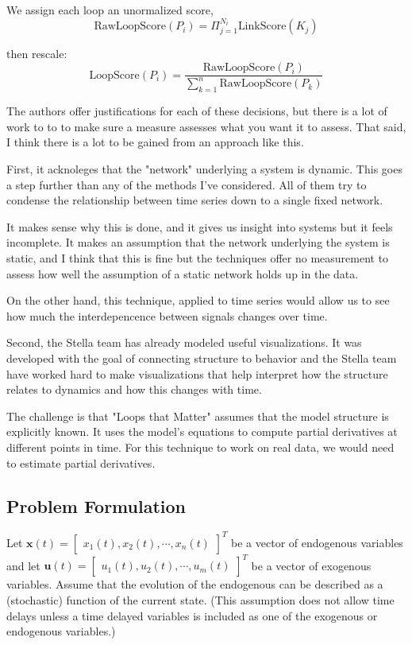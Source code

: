 \documentclass{article}
\begin{document}
        We assign each loop an unormalized score,
        \[
            \text{RawLoopScore}(P_i) = \Pi_{j=1}^{N_i} \text{LinkScore}(K_j)
        \]

        then rescale:
        \[
            \text{LoopScore}(P_i) = \frac{\text{RawLoopScore}(P_i)}{\sum_{k=1}^n \text{RawLoopScore}(P_k)}
        \]


        The authors offer justifications for each of these decisions, but there
        is a lot of work to to to make sure a measure assesses what you
        want it to assess. That said, I think there is a lot to be gained
        from an approach like this.

        First, it acknoleges that the "network" underlying a system
        is dynamic. This goes a step further than any of the methods I've
        considered. All of them try to condense the relationship between
        time series down to a single fixed network.

        It makes sense why this is done, and it gives us insight
        into systems but it feels incomplete. It makes an assumption that
        the network underlying the system is static, and I think that
        this is fine but the techniques
        offer no measurement to assess how well the assumption of a
        static network holds up in the data.

        On the other hand, this technique, applied to time series would allow
        us to see how much the interdepencence between signals changes over time.

        Second, the Stella team has already modeled useful visualizations.
        It was developed with the goal of connecting structure to behavior
        and the Stella team have worked hard to make visualizations
        that help interpret how the structure relates to dynamics
        and how this changes with time.

        The challenge is that "Loops that Matter" assumes that the model structure
        is explicitly known. It uses the model's equations to compute partial 
        derivatives at different points in time. For this technique to work on
        real data, we would need to estimate partial derivatives.

        \subsection{Problem Formulation}

        Let $\bm{x}(t) = \begin{bmatrix}
            x_1(t), x_2(t), \cdots, x_n(t)
        \end{bmatrix}^T$ be a vector of endogenous variables and let 
        $\bm{u}(t) = \begin{bmatrix}
            u_1(t), u_2(t), \cdots, u_m(t)
        \end{bmatrix}^T$ be a vector of exogenous variables. Assume that the
        evolution of the endogenous can be described as a (stochastic) function
        of the current state. (This assumption does not allow time
        delays unless a time delayed variables is included as one of the
        exogenous or endogenous variables.)
\end{document}
